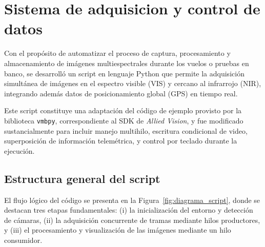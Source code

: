 
  \section{Sistema de adquisicion y control de datos}
  \label{sec:script_control_adquisicion}
  
  Con el propósito de automatizar el proceso de captura, procesamiento y almacenamiento de imágenes multiespectrales durante los vuelos o pruebas en banco, se desarrolló un script en lenguaje Python que permite la adquisición simultánea de imágenes en el espectro visible (VIS) y cercano al infrarrojo (NIR), integrando además datos de posicionamiento global (GPS) en tiempo real.
  
  \noindent Este script constituye una adaptación del código de ejemplo provisto por la biblioteca \texttt{vmbpy}, correspondiente al SDK de \textit{Allied Vision}, y fue modificado sustancialmente para incluir manejo multihilo, escritura condicional de video, superposición de información telemétrica, y control por teclado durante la ejecución.
  
  \subsection{Estructura general del script}
  
  El flujo lógico del código se presenta en la Figura~\ref{fig:diagrama_script}, donde se destacan tres etapas fundamentales: (i) la inicialización del entorno y detección de cámaras, (ii) la adquisición concurrente de tramas mediante hilos productores, y (iii) el procesamiento y visualización de las imágenes mediante un hilo consumidor.
  
